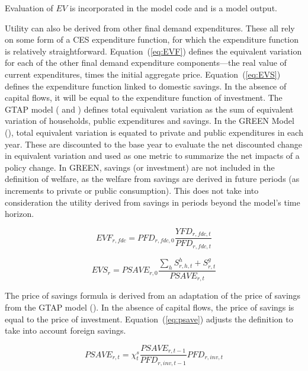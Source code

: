 \documentclass[11pt,letterpaper]{report}
\begin{document}
\noindent Evaluation of $\mathit{EV}$ is incorporated in the model code
and is a model output.

Utility can also be derived from other final demand expenditures.
These all rely on some form of a CES expenditure function, for
which the expenditure function is relatively straightforward.
Equation~(\ref{eq:EVF}) defines the equivalent variation for each of the
other final demand expenditure components---the real value
of current expenditures, times the initial aggregate price.
Equation~(\ref{eq:EVS}) defines the expenditure function
linked to domestic savings. In the absence of capital flows, it will
be equal to the expenditure function of investment.
The GTAP model (\cite{McDougall2003} and \cite{CorongetalJGEA2017})
defines total equivalent variation as the sum
of equivalent variation of households, public expenditures and
savings. In the GREEN Model (\cite{Burniauxetal1992}),
total equivalent variation is
equated to private and public expenditures in each year. These
are discounted to the base year to evaluate the net discounted
change in equivalent variation and used as one metric to
summarize the net impacts of a policy change. In GREEN, savings (or investment)
are not included in the definition of welfare,
as the welfare from savings are derived in future
periods (as increments to private or public consumption). This
does not take into consideration the utility derived from savings
in periods beyond the model's time horizon.

\begin{equation}
\label{eq:EVF}
\mathit{EVF}_{r,\mathit{fdc}} = \mathit{PFD}_{r,\mathit{fdc},0}
\frac{\mathit{YFD}_{r,\mathit{fdc},t}}{\mathit{PFD}_{r,\mathit{fdc},t}}
\end{equation}

\begin{equation}
\label{eq:EVS}
\mathit{EVS}_{r} = \mathit{PSAVE}_{r,0}
\frac{\sum_h{\mathit{S^h_{r,h,t}}} + S^g_{r,t}}{\mathit{PSAVE}_{r,t}}
\end{equation}

The price of savings formula is derived from an adaptation
of the price of savings from the GTAP model (\cite{DvdMJGEA2018}).
In the absence of capital flows, the price of savings is equal
to the price of investment. Equation~(\ref{eq:psave}) adjusts
the definition to take into account foreign savings.

\begin{equation}
\label{eq:psave}
\mathit{PSAVE}_{r,t} = \chi^s_t
\frac{\mathit{PSAVE}_{r,t-1}} {\mathit{PFD}_{r,\mathit{inv},t-1}}
\mathit{PFD}_{r,\mathit{inv},t}
\end{equation}
\end{document}
